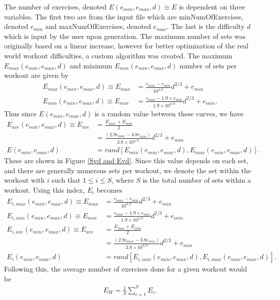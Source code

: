The number of exercises, denoted $E(e_{min},e_{max},d) \equiv E$ is dependent on three variables. The first two are from the input file which are minNumOfExercises, denoted $e_{min}$ and maxNumOfExercises, denoted $e_{max}$. The last is the difficulty $d$ which is input by the user upon generation. The maximum number of sets was originally based on a linear increase, however for better optimization of the real world workout difficulties, a custom algorithm was created. The maximum $E_{max}(e_{min},e_{max},d)$ and minimum $E_{min}(e_{min},e_{max},d)$ number of sets per workout are given by
\begin{align}
E_{max}(e_{min},e_{max},d) \equiv E_{max}&= \frac{e_{max}-e_{min}}{10^{4/3}} d^{2/3}+e_{min} \\
E_{min}(e_{min},e_{max},d) \equiv E_{min}&= \frac{e_{max}-1.9 \times e_{min}}{1.9 \times 10^{4/3}} d^{2/3}+e_{min}.
\end{align}
Thus since $E(e_{min},e_{max},d)$ is a random value between these curves, we have
\begin{align}
E_{ave}(e_{min},e_{max},d) \equiv E_{ave} &= \frac{E_{max}+ E_{min}}{2} \\ &= \frac{\left(2.9e_{max}-3.8e_{min}\right)}{3.8 \times 10^{4/3}}d^{2/3}+e_{min} \\
E(e_{min},e_{max},d) &= rand[E_{min}(e_{min},e_{max},d), E_{max}(e_{min},e_{max},d)].
\end{align}
These are shown in Figure \ref{Svd and Evd}. Since this value depends on each set, and there are generally numerous sets per workout, we denote the set within the workout with $i$ such that $1\leq i \leq S$, where $S$ is the total number of sets within a workout. Using this index, $E_i$ becomes
\begin{align}
	E_{i,max}(e_{min},e_{max},d) \equiv E_{max}&= \frac{e_{max}-e_{min}}{10^{4/3}} d^{2/3}+e_{min} \\
	E_{i,min}(e_{min},e_{max},d) \equiv E_{min}&= \frac{e_{max}-1.9 \times e_{min}}{1.9 \times 10^{4/3}} d^{2/3}+e_{min} \\
	E_{i,ave}(e_{min},e_{max},d) \equiv E_{ave} &= \frac{E_{max}+ E_{min}}{2} \\ &= \frac{\left(2.9e_{max}-3.8e_{min}\right)}{3.8 \times 10^{4/3}}d^{2/3}+e_{min} \\
	E_i(e_{min},e_{max},d) &= rand[E_{i,min}(e_{min},e_{max},d), E_{i,max}(e_{min},e_{max},d)].
\end{align}
Following this, the average number of exercises done for a given workout would be
\begin{align}
	E_{W} = \frac{1}{S}\sum_{i=1}^{S}E_i.
\end{align}

